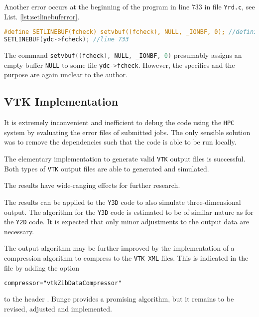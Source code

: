 \bigbreak
Another error occurs at the beginning of the program in line $733$ in file \texttt{Yrd.c}, see List. \ref{lst:setlinebuferror}.

\begin{lstlisting}[language=C, caption=\texttt{SETLINEBUF} Error in file \texttt{Yrd.c}, label=lst:setlinebuferror]
#define SETLINEBUF(fcheck) setvbuf((fcheck), NULL, _IONBF, 0); //definition
SETLINEBUF(ydc->fcheck); //line 733
\end{lstlisting}

The command \lstinline[language=C]{setvbuf((fcheck), NULL, _IONBF, 0)} presumably assigns an empty buffer \lstinline[language=C]{NULL} to some file \lstinline[language=C]{ydc->fcheck}. However, the specifics and the purpose are again unclear to the author.

\subsection{VTK Implementation}

It is extremely inconvenient and inefficient to debug the code using the \texttt{HPC} system by evaluating the error files of submitted jobs. The only sensible solution was to remove the dependencies such that the code is able to be run locally.

\bigbreak
The elementary implementation to generate valid \texttt{VTK} output files is successful. Both types of \texttt{VTK} output files are able to generated and simulated.

\bigbreak
The results have wide-ranging effects for further research. 

\bigbreak
The results can be applied to the \texttt{Y3D} code to also simulate three-dimensional output. The algorithm for the \texttt{Y3D} code is estimated to be of similar nature as for the \texttt{Y2D} code. It is expected that only minor adjustments to the output data are necessary. 

\bigbreak
The output algorithm may be further improved by the implementation of a compression algorithm to compress to the \texttt{VTK XML} files. This is indicated in the file by adding the option

\begin{lstlisting}[language=XML, frame=none, numbers=none,]
compressor="vtkZibDataCompressor"
\end{lstlisting}

to the header \cite{Kit}. Bunge \cite{Bun09} provides a promising algorithm, but it remains to be revised, adjusted and implemented.

